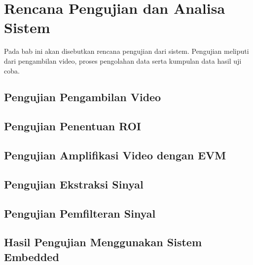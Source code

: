 \chapter{Rencana Pengujian dan Analisa Sistem}

\ifpdf
    \graphicspath{{Chapter4/Figs/tinggi/}{Chapter4/Figs/idv/}{Chapter4/Figs/}}
\else
    \graphicspath{{Chapter4/Figs/Vector/}{Chapter4/Figs/}}
\fi

Pada bab ini akan disebutkan rencana pengujian dari sistem. Pengujian meliputi dari pengambilan video, proses pengolahan data serta kumpulan data hasil uji coba.

\section{ Pengujian Pengambilan Video}
\section{ Pengujian Penentuan ROI}
\section{ Pengujian Amplifikasi Video dengan EVM}
\section{ Pengujian Ekstraksi Sinyal}
\section{ Pengujian Pemfilteran Sinyal}
\section{ Hasil Pengujian Menggunakan Sistem Embedded}